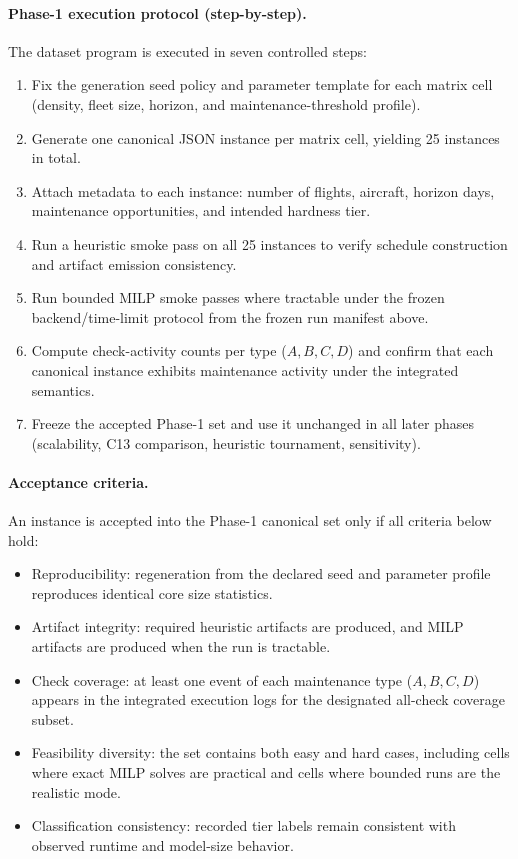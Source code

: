 \paragraph{Phase-1 execution protocol (step-by-step).}
The dataset program is executed in seven controlled steps:
\begin{enumerate}
  \item Fix the generation seed policy and parameter template for each matrix
    cell (density, fleet size, horizon, and maintenance-threshold profile).
  \item Generate one canonical JSON instance per matrix cell, yielding 25
    instances in total.
  \item Attach metadata to each instance: number of flights, aircraft,
    horizon days, maintenance opportunities, and intended hardness tier.
  \item Run a heuristic smoke pass on all 25 instances to verify schedule
    construction and artifact emission consistency.
  \item Run bounded MILP smoke passes where tractable under the frozen
    backend/time-limit protocol from
    the frozen run manifest above.
  \item Compute check-activity counts per type ($A,B,C,D$) and confirm that
    each canonical instance exhibits maintenance activity under the integrated
    semantics.
  \item Freeze the accepted Phase-1 set and use it unchanged in all later
    phases (scalability, C13 comparison, heuristic tournament, sensitivity).
\end{enumerate}

\paragraph{Acceptance criteria.}
An instance is accepted into the Phase-1 canonical set only if all criteria
below hold:
\begin{itemize}
  \item Reproducibility: regeneration from the declared seed and parameter
    profile reproduces identical core size statistics.
  \item Artifact integrity: required heuristic artifacts are produced, and
    MILP artifacts are produced when the run is tractable.
  \item Check coverage: at least one event of each maintenance type
    ($A,B,C,D$) appears in the integrated execution logs for the designated
    all-check coverage subset.
  \item Feasibility diversity: the set contains both easy and hard cases,
    including cells where exact MILP solves are practical and cells where
    bounded runs are the realistic mode.
  \item Classification consistency: recorded tier labels remain consistent with
    observed runtime and model-size behavior.
\end{itemize}


